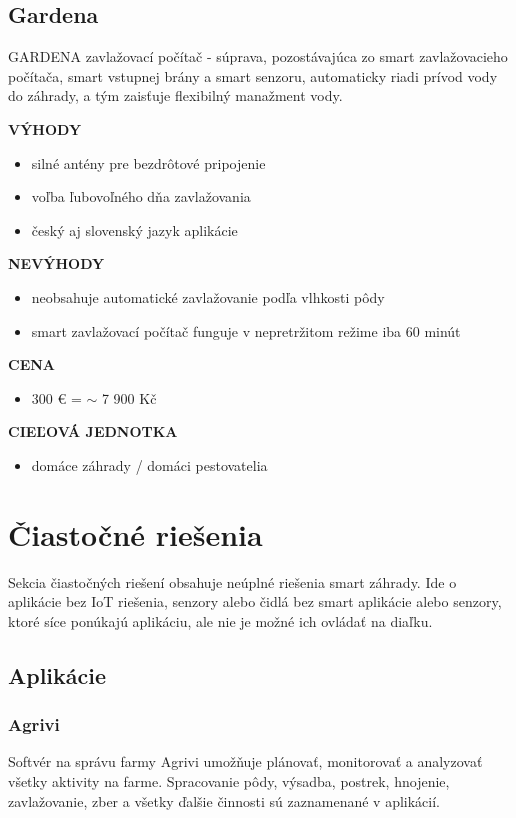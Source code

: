 \documentclass[twoside]{ctuthesis}
\theoremstyle{plain}
\theoremstyle{definition}
\theoremstyle{note}
\begin{document}
\subsection*{Gardena}
GARDENA zavlažovací počítač - súprava, pozostávajúca zo smart zavlažovacieho počítača, smart vstupnej brány a smart senzoru, automaticky riadi prívod vody do záhrady, a tým zaisťuje flexibilný manažment vody. \cite{gardena}
\newline

\textbf{VÝHODY}
\begin{itemize}
\item silné antény pre bezdrôtové pripojenie
\item voľba ľubovoľného dňa zavlažovania
\item český aj slovenský jazyk aplikácie
\end{itemize}

\textbf{NEVÝHODY}
\begin{itemize}
\item neobsahuje automatické zavlažovanie podľa vlhkosti pôdy
\item smart zavlažovací počítač funguje v nepretržitom režime iba 60 minút
\end{itemize}

\textbf{CENA}
\begin{itemize}
\item 300 €  =  $\sim$ 7 900 Kč 
\end{itemize}

\textbf{CIEĽOVÁ JEDNOTKA}
\begin{itemize}
\item domáce záhrady / domáci pestovatelia
\end{itemize}
 
 
\section{Čiastočné riešenia}
Sekcia čiastočných riešení obsahuje neúplné riešenia smart záhrady. Ide o aplikácie bez IoT riešenia, senzory alebo čidlá bez smart aplikácie alebo senzory, ktoré síce ponúkajú aplikáciu, ale nie je možné ich ovládať na diaľku.

\subsection{Aplikácie}
\subsubsection*{Agrivi}
Softvér na správu farmy Agrivi umožňuje plánovať, monitorovať a analyzovať všetky aktivity na farme. Spracovanie pôdy, výsadba, postrek, hnojenie, zavlažovanie, zber a všetky ďalšie činnosti sú zaznamenané v aplikácií. \cite{agrivi}
\newline
\end{document}
